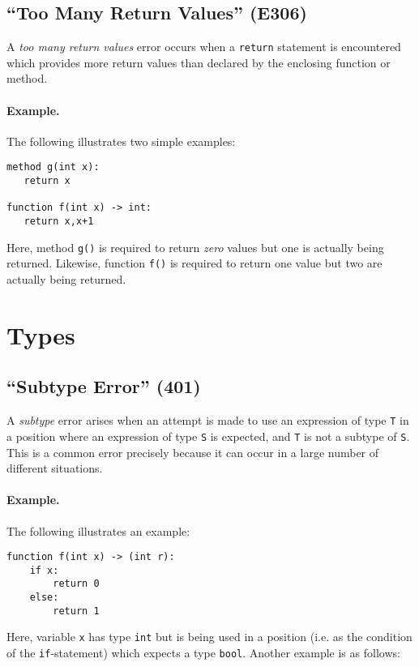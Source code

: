 \subsection{``Too Many Return Values'' (E306)}
A {\em too many return values} error occurs when a \lstinline{return} statement is encountered which provides more return values than declared by the enclosing function or method.  

\paragraph{Example.}  The following illustrates two simple examples:

\begin{lstlisting}
method g(int x):
   return x

function f(int x) -> int:
   return x,x+1
\end{lstlisting}

Here, method \lstinline{g()} is required to return {\em zero} values but one is actually being returned.  Likewise, function \lstinline{f()} is required to return one value but two are actually being returned.

\section{Types}
\label{c_err_types}

\subsection{``Subtype Error'' (401)}

A {\em subtype} error arises when an attempt is made to use an expression of type \lstinline{T} in a position where an expression of type \lstinline{S} is expected, and \lstinline{T} is not a subtype of \lstinline{S}.  This is a common error precisely because it can occur in a large number of different situations.

\paragraph{Example.}  The following illustrates an example:

\begin{lstlisting}
function f(int x) -> (int r):
    if x:
        return 0
    else:
        return 1
\end{lstlisting}

Here, variable \lstinline{x} has type \lstinline{int} but is being used in a position (i.e. as the condition of the \lstinline{if}-statement) which expects a type \lstinline{bool}.  Another example is as follows:

